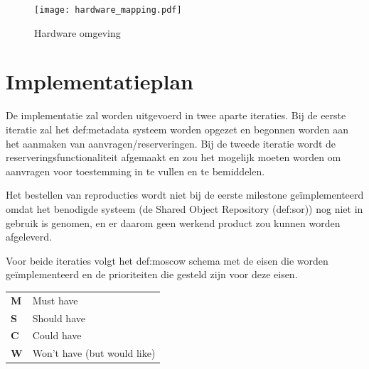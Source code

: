 \documentclass[a4paper,titlepage]{report}
\begin{document}
    \begin{figure}[H]
      \centering
      \texttt{[image: hardware\_mapping.pdf]}
      \caption{Hardware omgeving}
      \label{fig:hardware-omgeving}
    \end{figure}

\printglossary[title=Verklarende Woordenlijst,toctitle=Verklarende Woordenlijst]
\appendix
\chapter{Implementatieplan}
  \label{cha:implementatieplan}
  De implementatie zal worden uitgevoerd in twee aparte iteraties. Bij de eerste
  iteratie zal het \gls{def:metadata} systeem worden opgezet en begonnen worden aan het
  aanmaken van aanvragen/reserveringen. Bij de tweede iteratie wordt de
  reserveringsfunctionaliteit afgemaakt en zou het mogelijk moeten worden om
  aanvragen voor toestemming in te vullen en te bemiddelen.

  Het bestellen van reproducties wordt niet bij de eerste milestone
  ge\"implementeerd omdat het benodigde systeem (de Shared Object Repository
  (\gls{def:sor}))
  nog niet in gebruik is genomen, en er daarom geen werkend product zou kunnen
  worden afgeleverd.

  Voor beide iteraties volgt het \gls{def:moscow} schema met
  de eisen die worden ge\"implementeerd en de prioriteiten die gesteld zijn voor
  deze eisen.\\

  \begin{tabular}{| l l |}
    \hline
    \textbf{M} & Must have\\
    \textbf{S} & Should have\\
    \textbf{C} & Could have\\
    \textbf{W} & Won't have (but would like)\\
    \hline
  \end{tabular}\hfill
\end{document}

